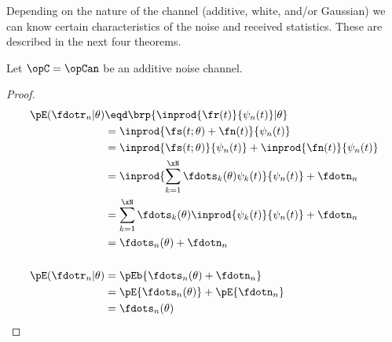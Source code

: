 Depending on the nature of the channel (additive, white, and/or Gaussian)
we can know certain characteristics of the noise and received statistics.
These are described in the next four theorems.


\begin{theorem}%
\label{thm:an_stats}
Let $\opC=\opCan$ be an additive noise channel.
\end{theorem}
\begin{proof}
\begin{align*}
   \pE(\fdotr_n |\theta)
     &\eqd \brp{\inprod{\fr(t)}{\psi_n(t)}  |\theta}
   \\&=    {\inprod{\fs(t;\theta)+\fn(t)}{\psi_n(t)}}
   \\&=    {\inprod{\fs(t;\theta)}{\psi_n(t)}} +   {\inprod{\fn(t)}{\psi_n(t)}}
   \\&=    \inprod{\sum_{k=1}^\xN \fdots_k(\theta) \psi_k(t)}{\psi_n(t)} + \fdotn_n
   \\&=    \sum_{k=1}^\xN \fdots_k(\theta) \inprod{\psi_k(t)}{\psi_n(t)} + \fdotn_n
   \\&=    \fdots_n(\theta)  + \fdotn_n
\\ \\
   \pE({\fdotr_n} | \theta)
     &= \pEb{\fdots_n(\theta)  + \fdotn_n}
   \\&= \pE{\fdots_n(\theta) } +   \pE{\fdotn_n}
   \\&= \fdots_n(\theta)
\end{align*}
\end{proof}


